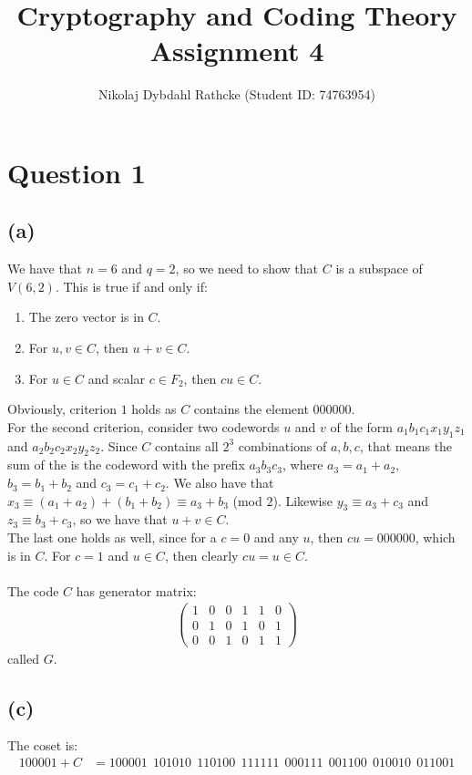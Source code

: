 \documentclass[a4paper, fleqn]{article}
\author{Nikolaj Dybdahl Rathcke (Student ID: 74763954)}
\title{Cryptography and Coding Theory  \\ Assignment 4}
\begin{document}
%

\section*{Question 1}
\subsection*{(a)}
We have that $n=6$ and $q=2$, so we need to show that $C$ is a subspace of $V(6,2)$. This
is true if and only if:
\begin{enumerate}
  \item The zero vector is in $C$.
  \item For $u,v\in C$, then $u+v\in C$.
  \item For $u\in C$ and scalar $c\in F_2$, then $cu\in C$.
\end{enumerate}
Obviously, criterion $1$ holds as $C$ contains the element $000000$. \\
For the second criterion, consider two codewords $u$ and $v$ of the form
$a_1b_1c_1x_1y_1z_1$ and $a_2b_2c_2x_2y_2z_2$. Since $C$ contains all $2^3$ combinations
of $a,b,c$, that means the sum of the is the codeword with the prefix $a_3b_3c_3$, where $a_3=a_1+a_2$, $b_3=b_1+b_2$ and $c_3=c_1+c_2$. We also have that $x_3\equiv (a_1+a_2)+(b_1+b_2)\equiv
a_3+b_3$ (mod $2$). Likewise $y_3\equiv a_3+c_3$ and $z_3\equiv b_3+c_3$, so we have that
$u+v\in C$. \\
The last one holds as well, since for a $c=0$ and any $u$, then $cu=000000$, which is in
$C$. For $c=1$ and $u\in C$, then clearly $cu=u\in C$. \\
\\
The code $C$ has generator matrix:
\begin{align*}
  \begin{pmatrix}
    1 & 0 & 0 & 1 & 1 & 0 \\
    0 & 1 & 0 & 1 & 0 & 1 \\
    0 & 0 & 1 & 0 & 1 & 1
  \end{pmatrix}
\end{align*}
called $G$.

\subsection*{(c)}
The coset is:
\begin{align*}
  100001+C &= 100001\ \ 101010\ \ 110100\ \ 111111\ \ 000111\ \ 001100\ \ 010010\ \ 011001
\end{align*}
\end{document}

